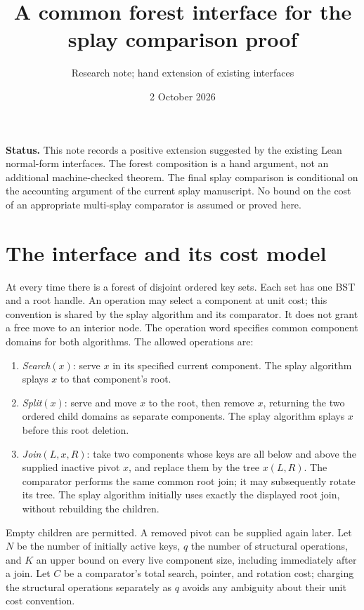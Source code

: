 \documentclass[11pt]{article}
\title{A common forest interface for the splay comparison proof}
\author{Research note; hand extension of existing interfaces}
\date{2 October 2026}
\begin{document}
\maketitle

\noindent\textbf{Status.}
This note records a positive extension suggested by the existing Lean
normal-form interfaces. The forest composition is a hand argument, not
an additional machine-checked theorem. The final splay comparison is
conditional on the accounting argument of the current splay manuscript.
No bound on the cost of an appropriate multi-splay comparator is assumed
or proved here.

\section{The interface and its cost model}

At every time there is a forest of disjoint ordered key sets. Each set
has one BST and a root handle. An operation may select a component at
unit cost; this convention is shared by the splay algorithm and its
comparator. It does not grant a free move to an interior node. The
operation word specifies common component domains for both algorithms.
The allowed operations are:
\begin{enumerate}
\item \emph{Search}$(x)$: serve $x$ in its specified current component.
The splay algorithm splays $x$ to that component's root.
\item \emph{Split}$(x)$: serve and move $x$ to the root, then remove
$x$, returning the two ordered child domains as separate components.
The splay algorithm splays $x$ before this root deletion.
\item \emph{Join}$(L,x,R)$: take two components whose keys are all
below and above the supplied inactive pivot $x$, and replace them by
the tree $x(L,R)$. The comparator performs the same common root join;
it may subsequently rotate its tree. The splay algorithm initially
uses exactly the displayed root join, without rebuilding the children.
\end{enumerate}
Empty children are permitted. A removed pivot can be supplied again
later. Let $N$ be the number of initially active keys, $q$ the number of
structural operations, and $K$ an upper bound on every live component
size, including immediately after a join. Let $C$ be a comparator's
total search, pointer, and rotation cost; charging the structural
operations separately as $q$ avoids any ambiguity about their unit
cost convention.
\end{document}
